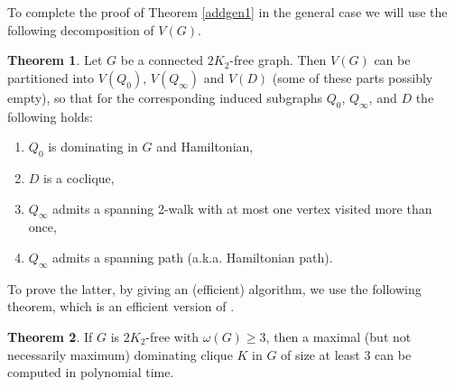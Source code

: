 \documentclass{amsart}
\theoremstyle{definition}
\newtheorem{theorem}{Theorem}
\begin{document}
To complete the proof of Theorem \ref{addgen1} in the general case
we will use the following decomposition of $V(G)$.
\begin{theorem}\label{thm1}
Let $G$ be a connected $2K_2$-free graph. Then $V(G)$ 
can be partitioned into $V(Q_0)$, $V(Q_{\infty})$ and $V(D)$ (some of these parts possibly empty), so that for the corresponding induced subgraphs
$Q_0$, $Q_\infty$, and $D$ the following holds: 
\begin{enumerate}
\item $Q_0$ is dominating in $G$ and Hamiltonian, \label{i51}
\item $D$ is a coclique,\label{i52}
\item $Q_{\infty}$ admits a spanning 2-walk with at most one vertex visited more than once, \label{i53}
\item $Q_{\infty}$ admits a spanning path (a.k.a. Hamiltonian path).\label{i54}
\end{enumerate}
\end{theorem}

To prove the latter, by giving an (efficient) algorithm, we use the following theorem, which is an
efficient version of \cite[Theorem 3]{chung1990maximum}.
\begin{theorem}\label{lm2}
If $G$ is $2K_2$-free with $\omega(G)\ge3$, then a maximal (but not necessarily maximum) dominating clique $K$ in $G$ of size at least 3
can be computed in polynomial time.
\end{theorem}
\end{document}
